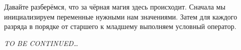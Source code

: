\documentclass{book}
\begin{document}
Давайте разберёмся, что за чёрная магия здесь происходит. Сначала мы инициализируем переменные нужными нам значениями. Затем
для каждого разряда в порядке от старшего к младшему выполняем условный оператор. 


{\em TO BE CONTINUED\dots}

% 
\end{document}

